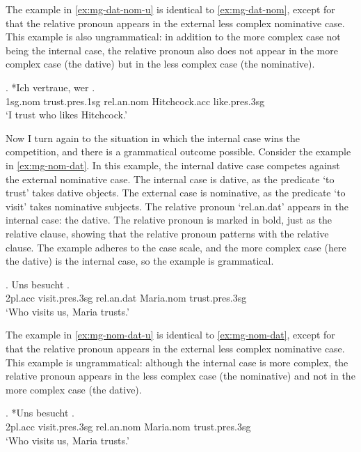 The example in \ref{ex:mg-dat-nom-u} is identical to \ref{ex:mg-dat-nom}, except for that the relative pronoun appears in the external less complex nominative case. This example is also ungrammatical: in addition to the more complex case not being the internal case, the relative pronoun also does not appear in the more complex case (the dative) but in the less complex case (the nominative).

\exg. *Ich vertraue, wer  .\\
1\ac{sg}.\ac{nom} trust.\ac{pres}.1\ac{sg}\scsub{[dat]} \ac{rel}.\ac{an}.\ac{nom} Hitchcock.\ac{acc} like.\ac{pres}.3\ac{sg}\scsub{[nom]}\\
`I trust who likes Hitchcock.' \label{ex:mg-dat-nom-u}

Now I turn again to the situation in which the internal case wins the competition, and there is a grammatical outcome possible.
Consider the example in \ref{ex:mg-nom-dat}. In this example, the internal dative case competes against the external nominative case.
The internal case is dative, as the predicate  `to trust' takes dative objects.
The external case is nominative, as the predicate  `to visit' takes nominative subjects.
The relative pronoun  `\ac{rel}.\ac{an}.\ac{dat}' appears in the internal case: the dative. The relative pronoun is marked in bold, just as the relative clause, showing that the relative pronoun patterns with the relative clause.
The example adheres to the case scale, and the more complex case (here the dative) is the internal case, so the example is grammatical.

\exg. Uns besucht   .\\
2\ac{pl}.\ac{acc} visit.\ac{pres}.3\ac{sg}\scsub{[nom]} \ac{rel}.\ac{an}.\ac{dat} Maria.\ac{nom} trust.\ac{pres}.3\ac{sg}\scsub{[dat]}\\
`Who visits us, Maria trusts.' \label{ex:mg-nom-dat}

The example in \ref{ex:mg-nom-dat-u} is identical to \ref{ex:mg-nom-dat}, except for that the relative pronoun appears in the external less complex nominative case. This example is ungrammatical: although the internal case is more complex, the relative pronoun appears in the less complex case (the nominative) and not in the more complex case (the dative).

\exg. *Uns besucht   .\\
2\ac{pl}.\ac{acc} visit.\ac{pres}.3\ac{sg}\scsub{[nom]} \ac{rel}.\ac{an}.\ac{nom} Maria.\ac{nom} trust.\ac{pres}.3\ac{sg}\scsub{[dat]}\\
`Who visits us, Maria trusts.' \label{ex:mg-nom-dat-u}

